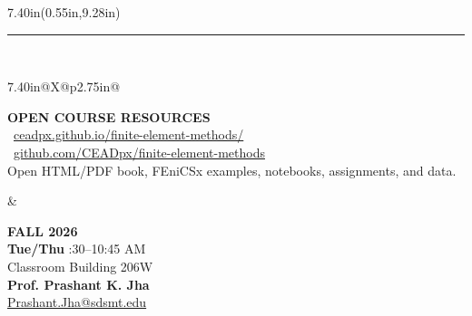 \documentclass[11pt]{article}
\begin{document}
\begin{textblock*}{7.40in}(0.55in,9.28in)
\textcolor{LightRule}{\rule{7.40in}{0.55pt}}\\[6pt]
\begin{tabularx}{7.40in}{@{}X@{\hspace{0.34in}}p{2.75in}@{}}
\begin{minipage}[t]{\linewidth}
{\fontsize{9.3}{11}\selectfont\bfseries\textcolor{WarmGray}{OPEN COURSE RESOURCES}}\\[2pt]
{\fontsize{9.7}{11.8}\selectfont
\faBookOpen\ \href{https://ceadpx.github.io/finite-element-methods/}{\textcolor{CEADTeal}{ceadpx.github.io/finite-element-methods/}}\\[1pt]
\faGithub\ \href{https://github.com/CEADpx/finite-element-methods}{\textcolor{CEADTeal}{github.com/CEADpx/finite-element-methods}}
}\\[2pt]
{\fontsize{8.4}{10.1}\selectfont\color{WarmGray}Open HTML/PDF book, FEniCSx examples, notebooks, assignments, and data.}
\end{minipage}
&
\begin{minipage}[t]{\linewidth}
{\fontsize{9.3}{11}\selectfont\bfseries\textcolor{WarmGray}{FALL 2026}}\\[2pt]
{\fontsize{9.5}{11.7}\selectfont
\textbf{Tue/Thu} :30--10:45 AM\\
Classroom Building 206W\\[2pt]
\textbf{Prof. Prashant K. Jha}\\[-1pt]
\href{mailto:Prashant.Jha@sdsmt.edu}{\textcolor{CEADTeal}{Prashant.Jha@sdsmt.edu}}
}
\end{minipage}
\end{tabularx}
\end{textblock*}
\end{document}
